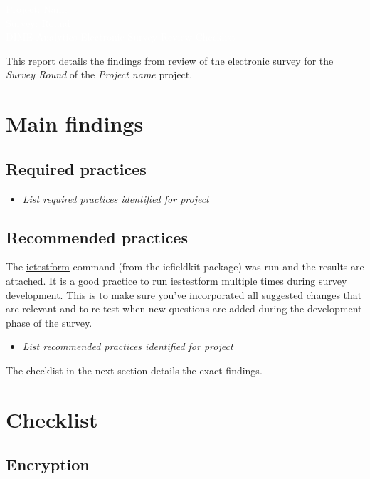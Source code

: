 \documentclass{report}
\newcommand{\titleBox}[1]{
	\begin{tcolorbox}
		[colframe = fontcolor,
		colback = fontcolor,
		sharp corners,
		halign = flush center,
		valign = center,
		height = 0.2\textwidth,
		after skip = 1cm]
		#1
	\end{tcolorbox}
}
\begin{document}
\titleBox{
	\textcolor{white}{\Large{Project: Name}} \\
	\textcolor{white}{\Large{Survey: Round}} \\
	\textcolor{white}{\Large{DIME Analytics Electronic Survey Review Checklist}}
}

This report details the findings from review of the electronic survey for the \textit{Survey Round}  of the \textit{Project name} project.
\section*{Main findings}

\subsection*{Required practices}
\begin{itemize}
	\item \textit{List required practices identified for project}
\end{itemize} 
\subsection*{Recommended practices}

The \href{https://dimewiki.worldbank.org/Ietestform}{ietestform} command (from the iefieldkit package) was run and the results are attached. It is a good practice to run iestestform multiple times during survey development. This is to make sure you’ve incorporated all suggested changes that are relevant and to re-test when new questions are added during the development phase of the survey.
\begin{itemize}
	\item \textit{List recommended practices identified for project}
\end{itemize}

The checklist in the next section details the exact findings.
\newpage 

\section*{Checklist}

		\subsection*{Encryption}


\newcommand{\makerow}[1]{%
 #1 &
 \stepcounter{row}%
 \mbox{\CheckBox[print,name=YES\therow, width=0.7em, height=0.7em]{}} &
 \mbox{\CheckBox[print,name=NO\therow, width=0.7em, height=0.7em]{}} &
 \mbox{\CheckBox[print,name=N/A\therow, width=0.7em, height=0.7em]{}} \\
}
\end{document}
